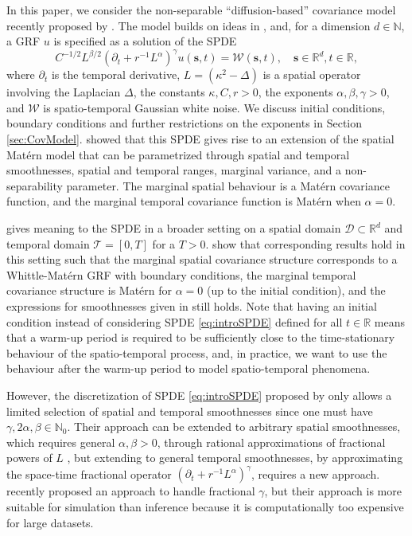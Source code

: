 \documentclass[12pt]{article} %
\begin{document}
In this paper, we consider the non-separable ``diffusion-based'' covariance model recently proposed by \citet{LindgrenBakka}. The model builds on ideas in \citet{krainski2018statistical}, and, for a dimension $d\in\mathbb{N}$, a GRF $u$ is specified as a solution of the SPDE
\begin{equation}
    C^{-1/2}L^{\beta/2}(\partial_t+r^{-1}L^\alpha)^\gamma u(\boldsymbol{s},t) = \mathcal{W}(\boldsymbol{s}, t), \quad \boldsymbol{s}\in\mathbb{R}^d, t\in\mathbb{R},\label{eq:introSPDE}
\end{equation}
where $\partial_t$ is the temporal derivative, $L = (\kappa^2 - \Delta)$ is a spatial operator involving the Laplacian $\Delta$, the constants $\kappa, C, r>0$, the exponents $\alpha, \beta, \gamma>0$, and $\mathcal{W}$ is spatio-temporal Gaussian white noise. We discuss initial conditions, boundary conditions and further restrictions on the exponents in Section \ref{sec:CovModel}. \citet{LindgrenBakka} showed that this SPDE gives rise to an extension of the spatial Matérn model that can be parametrized through spatial and temporal smoothnesses, spatial and temporal ranges, marginal variance, and a non-separability parameter. The marginal spatial behaviour is a Matérn covariance function, and the marginal temporal covariance function is Matérn when $\alpha = 0$.

\citet{kirchner2022} gives meaning to the SPDE in a broader setting on a spatial domain $\mathcal{D}\subset\mathbb{R}^d$ and temporal domain $\mathcal{T}=[0, T]$ for a $T > 0$. \citet[Corollaries 4.2, 4.3, and 5.2]{kirchner2022} show that corresponding results hold in this setting such that the marginal spatial covariance structure corresponds to a Whittle-Matérn GRF with boundary conditions, the marginal temporal covariance structure is Matérn for $\alpha = 0$ (up to the initial condition), and the expressions for smoothnesses given in \citet{LindgrenBakka} still holds. Note that having an initial condition instead of considering SPDE \eqref{eq:introSPDE} defined for all $t\in\mathbb{R}$ means that a warm-up period is required to be sufficiently close to the time-stationary behaviour of the spatio-temporal process,
and, in practice, we want to use the behaviour after the warm-up period to model spatio-temporal phenomena.

However, the discretization of SPDE \eqref{eq:introSPDE} proposed by \citet{LindgrenBakka} only allows a limited selection of spatial and temporal smoothnesses since one must have $\gamma, 2\alpha, \beta \in \mathbb{N}_0$. Their approach can be extended to arbitrary spatial smoothnesses, which requires general $\alpha, \beta>0$, through rational approximations of fractional powers of $L$  \citep{Bolin2019,bolin2024covariance}, but extending to general temporal smoothnesses, by approximating the space-time fractional operator $(\partial_t+r^{-1}L^\alpha)^\gamma$, requires a new approach. \citet{Furset2023} recently proposed an approach to handle fractional $\gamma$, but their approach is more suitable for simulation than inference because it is computationally too expensive for large datasets.
\end{document}
